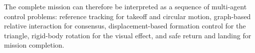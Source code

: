 The complete mission can therefore be interpreted as a sequence of multi-agent control problems: reference tracking for takeoff and circular motion, graph-based relative interaction for consensus, displacement-based formation control for the triangle, rigid-body rotation for the visual effect, and safe return and landing for mission completion.